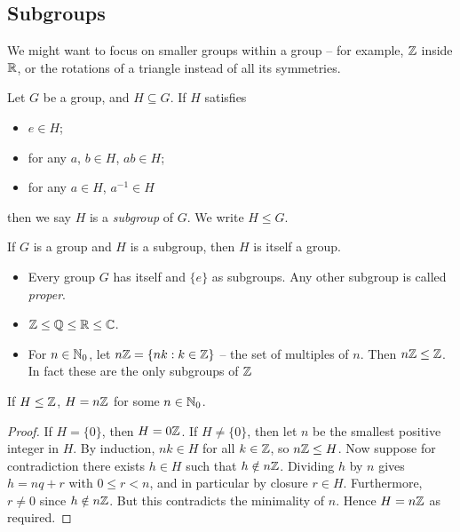 \documentclass{../../template/note}
\begin{document}
    \subsection{Subgroups}

    We might want to focus on smaller groups within a group -- for example, \(\mathbb Z\) inside \(\mathbb R\), or the rotations of a triangle instead of all its symmetries.

    \begin{definition}
        Let \(G\) be a group, and \(H \subseteq G\). If \(H\) satisfies
        \begin{itemize}
            \item \(e \in H\);
            \item for any \(a\), \(b \in H\), \(ab \in H\);
            \item for any \(a \in H\), \(a^{-1} \in H\)
        \end{itemize}
        then we say \(H\) is a \emph{subgroup} of \(G\). We write \(H \leq G\).
        
    \end{definition}
    
    \begin{remark*}
        If \(G\) is a group and \(H\) is a subgroup, then \(H\) is itself a group.
    \end{remark*}
    
    \begin{example*}
        \begin{itemize}
            \item Every group \(G\) has itself and \(\{e\}\) as subgroups. Any other subgroup is called \emph{proper}.
            \item \(\mathbb Z \leq \mathbb Q \leq \mathbb R \leq \mathbb C\).
            \item For \(n \in \mathbb N_0\), let \(n\mathbb Z = \{nk : k \in \mathbb Z\}\) -- the set of multiples of \(n\). Then \(n\mathbb Z \leq \mathbb Z\). In fact these are the only subgroups of \(\mathbb Z\)
            
        \end{itemize}
        
        
    \end{example*}
    
    \begin{proposition}
        If \(H \leq \mathbb Z\), \(H = n\mathbb Z\) for some \(n \in \mathbb N_0\).
    \end{proposition}
    
    \begin{proof}
        If \(H = \{0\}\), then \(H = 0\mathbb Z\). If \(H \neq \{0\}\), then let \(n\) be the smallest positive integer in \(H\). By induction, \(nk \in H\) for all \(k \in \mathbb Z\), so \(n\mathbb Z \leq H\). Now suppose for contradiction there exists \(h \in H\) such that \(h \notin n\mathbb Z\). Dividing \(h\) by \(n\) gives \(h = nq + r\) with \(0 \leq r < n\), and in particular by closure \(r \in H\). Furthermore, \(r \neq 0\) since \(h \notin n\mathbb Z\). But this contradicts the minimality of \(n\). Hence \(H = n\mathbb Z\) as required.
    \end{proof}
    
\end{document}

